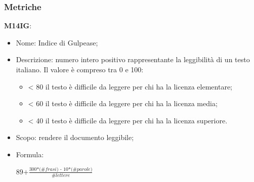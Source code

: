 \subsubsection{Metriche}
\textbf{M14IG}:
    \begin{itemize}
      \item Nome: Indice di Gulpease;
      \item Descrizione: numero intero positivo rappresentante la leggibilità di un testo italiano. Il valore è compreso tra 0 e 100:
           \begin{itemize}
                \item < 80 il testo è difficile da leggere per chi ha la licenza elementare;
                \item < 60 il testo è difficile da leggere per chi ha la licenza media;
                \item < 40 il testo è difficile da leggere per chi ha la licenza superiore.
           \end{itemize}
      \item Scopo: rendere il documento leggibile;
      \item Formula:
      \begin{center}
        $ \textit{89+}\frac{\textit{300*(\#frasi) - 10*(\#parole)}}{\textit{\#lettere}}$
      \end{center}
\end{itemize}